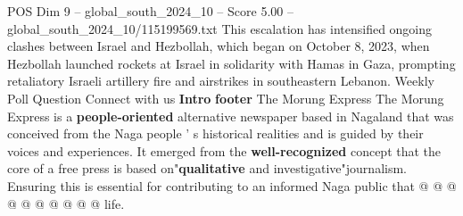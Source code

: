 \begin{textsample}{POS Dim 9 – global\_south\_2024\_10 – Score 5.00 – global\_south\_2024\_10/115199569.txt}
This escalation has intensified ongoing clashes between Israel and Hezbollah, which began on October 8, 2023, when Hezbollah launched rockets at Israel in solidarity with Hamas in Gaza, prompting retaliatory Israeli artillery fire and airstrikes in southeastern Lebanon.
Weekly Poll Question Connect with us \textbf{Intro} \textbf{footer} The Morung Express The Morung Express is a \textbf{people-oriented} alternative newspaper based in Nagaland that was conceived from the Naga people ' s historical realities and is guided by their voices and experiences.
It emerged from the \textbf{well-recognized} concept that the core of a free press is based on"\textbf{qualitative} and investigative"journalism.
Ensuring this is essential for contributing to an informed Naga public that @ @ @ @ @ @ @ @ @ @ life.

\end{textsample}
